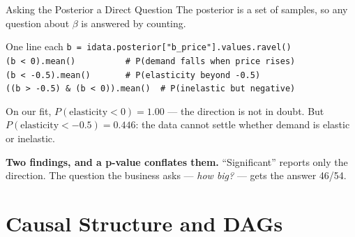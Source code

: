 \documentclass[aspectratio=169, 11pt]{beamer}
\begin{document}
\begin{frame}{Asking the Posterior a Direct Question}
  The posterior is a set of samples, so any question about $\beta$ is answered by counting.

  \begin{examplebox}{One line each}
    {\scriptsize\linespread{1.05}\selectfont
    \texttt{b = idata.posterior["b\_price"].values.ravel()}\\[2pt]
    \texttt{(b < 0).mean()\ \ \ \ \ \ \ \ \ \ \# P(demand falls when price rises)}\\
    \texttt{(b < -0.5).mean()\ \ \ \ \ \ \ \# P(elasticity beyond -0.5)}\\
    \texttt{((b > -0.5) \& (b < 0)).mean()\ \ \# P(inelastic but negative)}
    }
  \end{examplebox}

  On our fit, $P(\text{elasticity} < 0) = \mathbf{1.00}$ --- the direction is not in doubt. But
  $P(\text{elasticity} < -0.5) = \mathbf{0.446}$: the data cannot settle whether demand is elastic
  or inelastic.

  \begin{keybox}
    \textbf{Two findings, and a p-value conflates them.} ``Significant'' reports only the
    direction. The question the business asks --- \emph{how big?} --- gets the answer 46/54.
  \end{keybox}

\end{frame}

\section{Causal Structure and DAGs}

\end{document}
